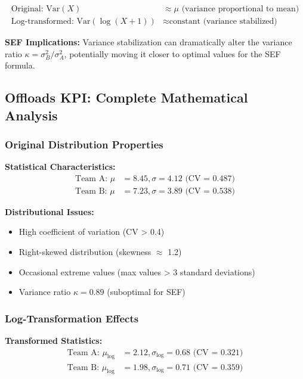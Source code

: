 \begin{align}
\text{Original: } \text{Var}(X) &\approx \mu \text{ (variance proportional to mean)} \\
\text{Log-transformed: } \text{Var}(\log(X + 1)) &\approx \text{constant (variance stabilized)}
\end{align}

\textbf{SEF Implications:} Variance stabilization can dramatically alter the variance ratio $\kappa = \sigma_B^2/\sigma_A^2$, potentially moving it closer to optimal values for the SEF formula.

\subsection{Offloads KPI: Complete Mathematical Analysis}

\subsubsection{Original Distribution Properties}

\textbf{Statistical Characteristics:}
\begin{align}
\text{Team A: } \mu &= 8.45, \sigma = 4.12 \text{ (CV = 0.487)} \\
\text{Team B: } \mu &= 7.23, \sigma = 3.89 \text{ (CV = 0.538)}
\end{align}

\textbf{Distributional Issues:}
\begin{itemize}
    \item High coefficient of variation (CV > 0.4)
    \item Right-skewed distribution (skewness $\approx$ 1.2)
    \item Occasional extreme values (max values > 3 standard deviations)
    \item Variance ratio $\kappa = 0.89$ (suboptimal for SEF)
\end{itemize}

\subsubsection{Log-Transformation Effects}

\textbf{Transformed Statistics:}
\begin{align}
\text{Team A: } \mu_{\log} &= 2.12, \sigma_{\log} = 0.68 \text{ (CV = 0.321)} \\
\text{Team B: } \mu_{\log} &= 1.98, \sigma_{\log} = 0.71 \text{ (CV = 0.359)}
\end{align}


